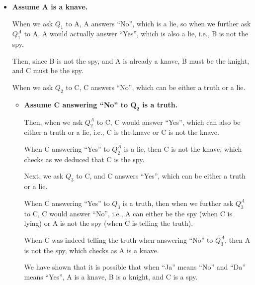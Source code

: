 \documentclass[answers]{exam}
\begin{document}
\begin{questions}
\begin{solution}
\begin{itemize}
\begin{itemize}
                \item \textbf{Assume A is a knave.}
                
                When we ask $Q_1$ to A, A answers ``No'', which is a lie, so when we further
                ask $Q^A_1$ to A, A would actually answer ``Yes'', which is also a lie, i.e.,
                B is not the spy.

                Then, since B is not the spy, and A is already a knave, B must be the knight,
                and C must be the spy.

                When we ask $Q_2$ to C, C answers ``No'', which can be either a truth or a lie.

                \begin{itemize}
                    \item \textbf{Assume C answering ``No'' to $\bm{Q_2}$ is a truth.}
                    
                    Then, when we ask $Q^A_2$ to C, C would answer ``Yes'', which can also be
                    either a truth or a lie, i.e., C is the knave or C is not the knave.

                    When C answering ``Yes'' to $Q^A_2$ is a lie, then C is not the knave,
                    which checks as we deduced that C is the spy.

                    Next, we ask $Q_3$ to C, and C answers ``Yes'', which can be either a truth
                    or a lie.

                    When C answering ``Yes'' to $Q_3$ is a truth, then when we further ask $Q^A_3$
                    to C, C would answer ``No'', i.e., A can either be the spy (when C is lying)
                    or A is not the spy (when C is telling the truth).

                    When C was indeed telling the truth when answering ``No'' to $Q^A_3$, then A
                    is not the spy, which checks as A is a knave.

                    We have shown that it is possible that when ``Ja'' means ``No'' and ``Da''
                    means ``Yes'', A is a knave, B is a knight, and C is a spy.
                \end{itemize}
            \end{itemize}
        \end{itemize}


\end{solution}
\end{questions}
\end{document}
